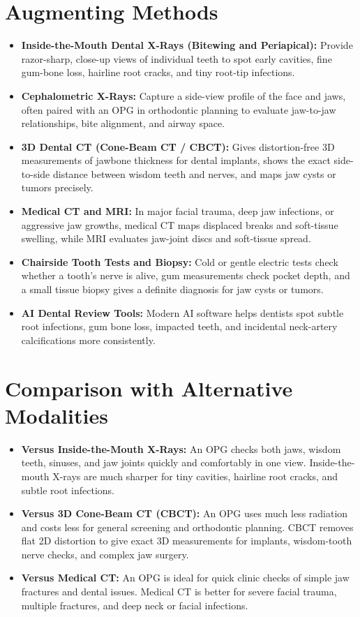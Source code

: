 \section{Augmenting Methods}
\begin{itemize}
\item \textbf{Inside-the-Mouth Dental X-Rays (Bitewing and Periapical):} Provide razor-sharp, close-up views of individual teeth to spot early cavities, fine gum-bone loss, hairline root cracks, and tiny root-tip infections.
\item \textbf{Cephalometric X-Rays:} Capture a side-view profile of the face and jaws, often paired with an OPG in orthodontic planning to evaluate jaw-to-jaw relationships, bite alignment, and airway space.
\item \textbf{3D Dental CT (Cone-Beam CT / CBCT):} Gives distortion-free 3D measurements of jawbone thickness for dental implants, shows the exact side-to-side distance between wisdom teeth and nerves, and maps jaw cysts or tumors precisely.
\item \textbf{Medical CT and MRI:} In major facial trauma, deep jaw infections, or aggressive jaw growths, medical CT maps displaced breaks and soft-tissue swelling, while MRI evaluates jaw-joint discs and soft-tissue spread.
\item \textbf{Chairside Tooth Tests and Biopsy:} Cold or gentle electric tests check whether a tooth's nerve is alive, gum measurements check pocket depth, and a small tissue biopsy gives a definite diagnosis for jaw cysts or tumors.
\item \textbf{AI Dental Review Tools:} Modern AI software helps dentists spot subtle root infections, gum bone loss, impacted teeth, and incidental neck-artery calcifications more consistently.
\end{itemize}

\section{Comparison with Alternative Modalities}
\begin{itemize}
\item \textbf{Versus Inside-the-Mouth X-Rays:} An OPG checks both jaws, wisdom teeth, sinuses, and jaw joints quickly and comfortably in one view. Inside-the-mouth X-rays are much sharper for tiny cavities, hairline root cracks, and subtle root infections.
\item \textbf{Versus 3D Cone-Beam CT (CBCT):} An OPG uses much less radiation and costs less for general screening and orthodontic planning. CBCT removes flat 2D distortion to give exact 3D measurements for implants, wisdom-tooth nerve checks, and complex jaw surgery.
\item \textbf{Versus Medical CT:} An OPG is ideal for quick clinic checks of simple jaw fractures and dental issues. Medical CT is better for severe facial trauma, multiple fractures, and deep neck or facial infections.
\end{itemize}

